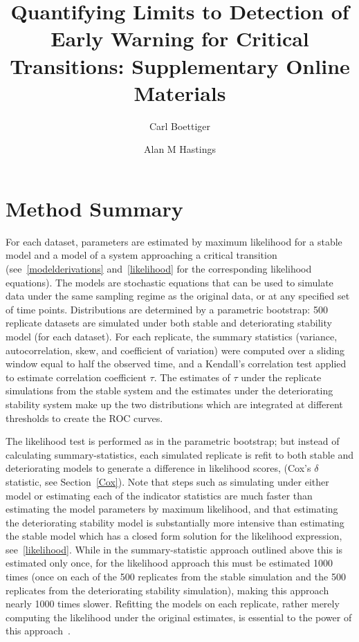 \documentclass[authoryear, preprint,review,12pt]{elsarticle}
\begin{document}
\begin{frontmatter}
\title{Quantifying Limits to Detection of Early Warning for Critical Transitions: Supplementary Online Materials}
\author[davis]{Carl Boettiger}
\author[davis]{Alan M Hastings}
\address[davis]{Center for Population Biology, University of California, Davis, United States}


\end{frontmatter}


\appendix

\section{Method Summary}
For each dataset, parameters are estimated by maximum likelihood for a stable model and a model of a system approaching a critical transition (see~\ref{modelderivations} and~\ref{likelihood} for the corresponding likelihood equations).  The models are stochastic equations that can be used to simulate data under the same sampling regime as the original data, or at any specified set of time points.  Distributions are determined by a parametric bootstrap: 500 replicate datasets are simulated under both stable and deteriorating stability model (for each dataset).  For each replicate, the summary statistics (variance, autocorrelation, skew, and coefficient of variation) were computed over a sliding window equal to half the observed time, and a Kendall's correlation test applied to estimate correlation coefficient $\tau$.  The estimates of $\tau$ under the replicate simulations from the stable system and the estimates under the deteriorating stability system make up the two distributions which are integrated at different thresholds to create the ROC curves.  

The likelihood test is performed as in the parametric bootstrap; but instead of calculating summary-statistics, each simulated replicate is refit to both stable and deteriorating models to generate a difference in likelihood scores, (Cox's $\delta$ statistic, see Section~\ref{Cox}).  Note that steps such as simulating under either model or estimating each of the indicator statistics are much faster than estimating the model parameters by maximum likelihood, and that estimating the deteriorating stability model is substantially more intensive than estimating the stable model which has a closed form solution for the likelihood expression, see~\ref{likelihood}.  While in the summary-statistic approach outlined above this is estimated only once, for the likelihood approach this must be estimated 1000 times (once on each of the 500 replicates from the stable simulation and the 500 replicates from the deteriorating stability simulation), making this approach nearly 1000 times slower.  Refitting the models on each replicate, rather merely computing the likelihood under the original estimates, is essential to the power of this approach~\citep{Huelsenbeck1996}.
\end{document}
